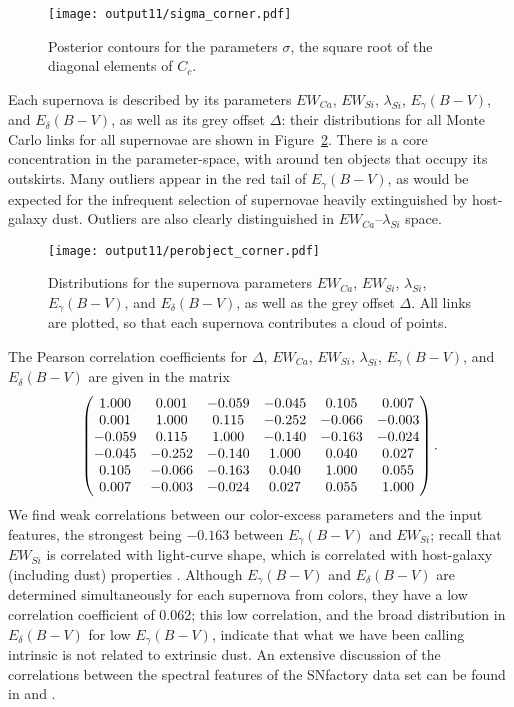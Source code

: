 \documentclass{aastex61}   	%
\begin{document}
 \begin{figure}[htbp] %
   \centering
   \texttt{[image: output11/sigma\_corner.pdf]} 
   \caption{Posterior contours for the parameters $\sigma$, the square root of the diagonal elements of $C_c$.
   \label{sigma:fig}}
\end{figure}

Each supernova is described by its parameters $EW_{Ca}$, $EW_{Si}$, $\lambda_{Si}$, $E_\gamma(B-V)$, and $E_\delta(B-V)$, as well as its grey offset
$\Delta$: their distributions for all Monte Carlo links for all supernovae are shown in Figure~\ref{perobject:fig}.
There is a core concentration in the  parameter-space, with around ten objects that occupy its outskirts.
Many outliers appear in the red tail of $E_\gamma(B-V)$, as would be expected for the infrequent selection of supernovae
heavily extinguished by host-galaxy dust.
Outliers  are also clearly distinguished in  $EW_{Ca}$--$\lambda_{Si}$ space.

\begin{figure}[htbp] %
   \centering
   \texttt{[image: output11/perobject\_corner.pdf]} 
   \caption{Distributions for the supernova parameters $EW_{Ca}$, $EW_{Si}$, $\lambda_{Si}$, $E_\gamma(B-V)$, and $E_\delta(B-V)$, as well as the grey offset
$\Delta$.  All links are plotted, so that each supernova contributes a cloud of points.
   \label{perobject:fig}}
\end{figure}

The Pearson correlation coefficients for $\Delta$, $EW_{Ca}$, $EW_{Si}$, $\lambda_{Si}$, $E_\gamma(B-V)$, and $E_\delta(B-V)$ are given in the matrix
\begin{equation}
\begin{pmatrix}
1.000 & 0.001 & -0.059 & -0.045 & 0.105 & 0.007 \cr
0.001 & 1.000 & 0.115 & -0.252 & -0.066 & -0.003 \cr
-0.059 & 0.115 & 1.000 & -0.140 & -0.163 & -0.024 \cr
-0.045 & -0.252 & -0.140 & 1.000 & 0.040 & 0.027 \cr
0.105 & -0.066 & -0.163 & 0.040 & 1.000 & 0.055 \cr
0.007 & -0.003 & -0.024 & 0.027 & 0.055 & 1.000
\end{pmatrix}.
\end{equation}
\color{red}
We find weak correlations between our color-excess parameters and the input features, the strongest being $-0.163$ between
$E_\gamma(B-V)$ and $EW_{Si}$;
\color{black}
recall that $EW_{Si}$ is correlated with light-curve shape, which is correlated with host-galaxy (including dust) properties 
\citep{2003MNRAS.340.1057S}.
Although $E_\gamma(B-V)$ and $E_\delta(B-V)$ are determined simultaneously for each supernova from colors, they have a low correlation coefficient of 0.062;
this low correlation, and the broad distribution in $E_\delta(B-V)$ for low $E_\gamma(B-V)$,  indicate that what we have been calling intrinsic
is not related to extrinsic dust.
An extensive discussion of the correlations between the spectral features of the SNfactory data set can be found in \citet{chotard:thesis}
and \citet{leget:thesis}.
\end{document}
